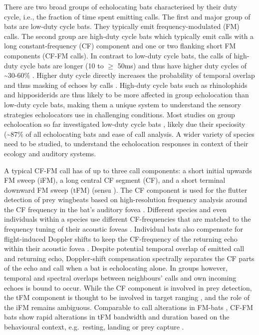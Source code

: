 \documentclass[
]{book}
\begin{document}
There are two broad groups of echolocating bats \citep{fenton2012evolution} characterised by their duty cycle, i.e., the fraction of time spent emitting calls. The first and major group of bats are low-duty cycle bats. They typically emit frequency-modulated (FM) calls. The second group are high-duty cycle bats which typically emit calls with a long constant-frequency (CF) component and one or two flanking short FM components (CF-FM calls). In contrast to low-duty cycle bats, the calls of high-duty cycle bats are longer (10 to \(\geq\) 50ms) and thus have higher duty cycles of \textasciitilde30-60\(\%\) \citep{fenton2012evolution}. Higher duty cycle directly increases the probability of temporal overlap and thus masking of echoes by calls \citep{beleyur2019modeling}. High-duty cycle bats such as rhinolophids and hipposiderids are thus likely to be more affected in group echolocation than low-duty cycle bats, making them a unique system to understand the sensory strategies echolocators use in challenging conditions. Most studies on group echolocation so far investigated low-duty cycle bats \citep{lin2016a, fawcett2015clutter, gotze2016no}, likely due their speciosity (\textasciitilde87\% of all echolocating bats \citep{fenton2012evolution, mammdivdatabase} and ease of call analysis. A wider variety of species need to be studied, to understand the echolocation responses in context of their ecology and auditory systems.

A typical CF-FM call has of up to three call components: a short initial upwards FM sweep (iFM), a long central CF segment (CF), and a short terminal downward FM sweep (tFM) (sensu \citet{tian1997echolocation}). The CF component is used for the flutter detection of prey wingbeats \citep{schnitzler2011auditory} based on high-resolution frequency analysis around the CF frequency in the bat's auditory fovea \citep{neuweiler2000biology}. Different species and even individuals within a species use different CF-frequencies that are matched to the frequency tuning of their acoustic foveas \citep{schnitzler1976peripheral}. Individual bats also compensate for flight-induced Doppler shifts to keep the CF-frequency of the returning echo within their acoustic fovea \citep{schnitzler1973control, schoeppler2018precise}. Despite potential temporal overlap of emitted call and returning echo, Doppler-shift compensation spectrally separates the CF parts of the echo and call when a bat is echolocating alone. In groups however, temporal and spectral overlaps between neighbours' calls and own incoming echoes is bound to occur. While the CF component is involved in prey detection, the tFM component is thought to be involved in target ranging \citep{tian1997echolocation, neuweiler1987foraging}, and the role of the iFM remains ambiguous. Comparable to call alterations in FM-bats \citep{Fenton2014}, CF-FM bats show rapid alterations in tFM bandwidth and duration based on the behavioural context, e.g.~resting, landing or prey capture \citep{neuweiler1987foraging, schoeppler2018precise, tian1997echolocation}.
\end{document}

